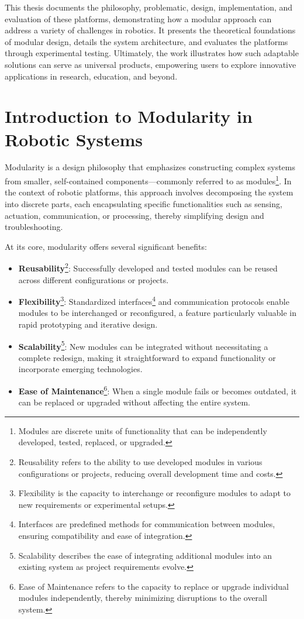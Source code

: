 This thesis documents the philosophy, problematic, design, implementation, and evaluation of these platforms, demonstrating how a modular approach can address a variety of challenges in robotics. It presents the theoretical foundations of modular design, details the system architecture, and evaluates the platforms through experimental testing. Ultimately, the work illustrates how such adaptable solutions can serve as universal products, empowering users to explore innovative applications in research, education, and beyond.

\section{Introduction to Modularity in Robotic Systems}
Modularity is a design philosophy that emphasizes constructing complex systems from smaller, self-contained components---commonly referred to as modules\footnote{Modules are discrete units of functionality that can be independently developed, tested, replaced, or upgraded.}. In the context of robotic platforms, this approach involves decomposing the system into discrete parts, each encapsulating specific functionalities such as sensing, actuation, communication, or processing, thereby simplifying design and troubleshooting.

At its core, modularity offers several significant benefits:

\begin{itemize}
  \item \textbf{Reusability}\footnote{Reusability refers to the ability to use developed modules in various configurations or projects, reducing overall development time and costs.}: Successfully developed and tested modules can be reused across different configurations or projects.
  \item \textbf{Flexibility}\footnote{Flexibility is the capacity to interchange or reconfigure modules to adapt to new requirements or experimental setups.}: Standardized interfaces\footnote{Interfaces are predefined methods for communication between modules, ensuring compatibility and ease of integration.} and communication protocols enable modules to be interchanged or reconfigured, a feature particularly valuable in rapid prototyping and iterative design.
  \item \textbf{Scalability}\footnote{Scalability describes the ease of integrating additional modules into an existing system as project requirements evolve.}: New modules can be integrated without necessitating a complete redesign, making it straightforward to expand functionality or incorporate emerging technologies.
  \item \textbf{Ease of Maintenance}\footnote{Ease of Maintenance refers to the capacity to replace or upgrade individual modules independently, thereby minimizing disruptions to the overall system.}: When a single module fails or becomes outdated, it can be replaced or upgraded without affecting the entire system.
\end{itemize}

